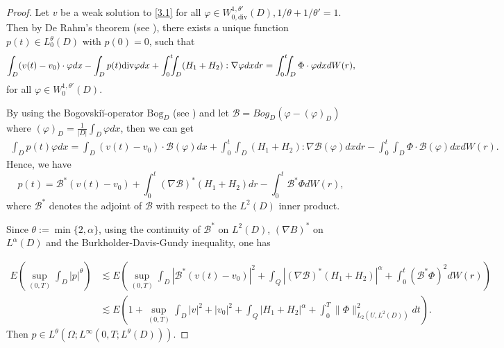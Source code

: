 \documentclass[reqno]{amsart}
\theoremstyle{definition}
\theoremstyle{remark}
\numberwithin{equation}{section} \allowdisplaybreaks
\begin{document}
\begin{proof}
Let $v$ be a weak solution to \eqref{3.1} for all $\varphi\in
W_{0,\text{div}}^{1,\theta'}(D),1/\theta+1/\theta'=1$. Then by De
Rahm's theorem (see \cite{GPG}), there exists a unique function
$p(t)\in L_0^\theta(D)$ with $p(0)=0$, such that
\begin{align*}
\int_{D}(v(t)-v_0)\cdot\varphi dx-\int_{D}p(t){\rm{div}}\varphi
dx+\int_0^t\!\!\!\int_{D}(H_1+H_2):\nabla\varphi
dxdr=\int_0^t\!\!\!\int_{D}\Phi\cdot\varphi dx dW(r),
\end{align*} for all
$\varphi\in W_{0}^{1,\theta'}(D)$.

By using the Bogovski\u{i}-operator $\text{Bog}_D$ (see \cite{MEB})
and let $\mathcal{B}=Bog_{D}(\varphi-(\varphi)_D)$ where
$(\varphi)_D=\frac{1}{|D|}\int_{D}\varphi dx$, then we can get
\begin{align*}\int_{D}p(t)\varphi
dx\!=\!\!\int_{D}(v(t)-v_0)\cdot\mathcal{B}(\varphi)dx\!+\!\!\int_0^t\!\!\!\int_{D}(H_1\!+\!H_2):\nabla\mathcal{B}(\varphi)dxdr
\!-\!\!\int_0^t\!\!\!\int_{D}\!\Phi\cdot\mathcal{B}(\varphi)dx
dW(r).
\end{align*}
Hence, we have
$$p(t)=\mathcal{B}^*(v(t)-v_0)+\int_0^t(\nabla\mathcal{B})^*(H_1+H_2)dr-\int_0^t\mathcal{B}^*\Phi dW(r),$$
where $\mathcal{B}^*$ denotes the adjoint of $\mathcal{B}$ with
respect to the $L^2(D)$ inner product.

Since $\theta:=\min\{2,\alpha\}$, using the continuity of
$\mathcal{B}^*$
on $L^2(D)$, $(\nabla B)^*$ on $L^\alpha(D)$ and the %
Burkholder-Davis-Gundy inequality, one has

\begin{equation}\label{3.2}
\begin{split}
E\!\left(\sup_{(0,T)}\!\int_{D}|p|^\theta \right)\!&\lesssim\!
E\!\left(\sup_{(0,T)}\!\int_{D}\!|\mathcal{B}^*(v(t)-v_0)|^2
\!+\!\int_Q\!|(\nabla\mathcal{B})^*(H_1+H_2)|^\alpha\!+\!\int_0^t\!(\mathcal{B}^*\Phi)^2dW(r)\right)\\
&\lesssim\!
E\!\left(1\!+\!\sup_{(0,T)}\int_{D}|v|^2\!+\!|v_0|^2+\int_Q|H_1+H_2|^\alpha
\!+\!\int_0^T\|\Phi\|^2_{L_2({U},L^2(D))}dt\right).
\end{split}
\end{equation}
Then $p\in L^\theta(\Omega; L^\infty(0,T;L^\theta(D)))$.


\end{proof}
\end{document}
